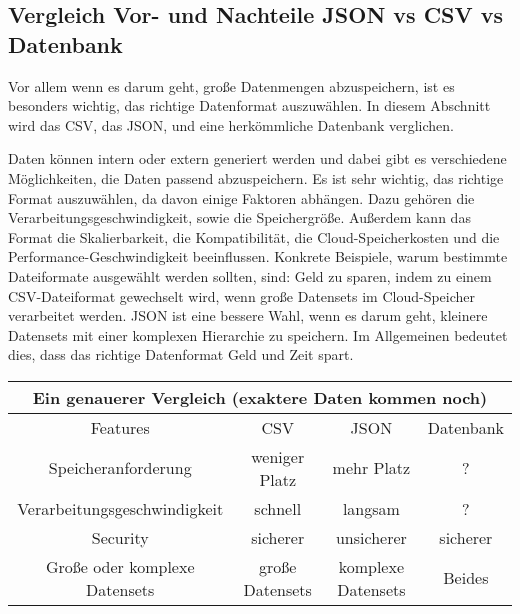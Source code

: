 \subsection{Vergleich Vor- und Nachteile JSON vs CSV vs Datenbank}

Vor allem wenn es darum geht, große Datenmengen abzuspeichern, ist es besonders wichtig, das richtige Datenformat auszuwählen. In diesem Abschnitt wird das CSV, das JSON, und eine herkömmliche Datenbank verglichen. 

Daten können intern oder extern generiert werden und dabei gibt es verschiedene Möglichkeiten, die Daten passend abzuspeichern. Es ist sehr wichtig, das richtige Format auszuwählen, da davon einige Faktoren abhängen. Dazu gehören die Verarbeitungsgeschwindigkeit, sowie die Speichergröße. 
Außerdem kann das Format die Skalierbarkeit, die Kompatibilität, die Cloud-Speicherkosten und die Performance-Geschwindigkeit beeinflussen. 
Konkrete Beispiele, warum bestimmte Dateiformate ausgewählt werden sollten, sind: Geld zu sparen, indem zu einem CSV-Dateiformat gewechselt wird, wenn große Datensets im Cloud-Speicher verarbeitet werden. JSON ist eine bessere Wahl, wenn es darum geht, kleinere Datensets mit einer komplexen Hierarchie zu speichern. 
Im Allgemeinen bedeutet dies, dass das richtige Datenformat Geld und Zeit spart. \cite{csvOrJson}

\begin{center}
    \begin{tabular}{ |c|c|c|c| } 
     \hline
     \multicolumn{4}{|c|}{Ein genauerer Vergleich (exaktere Daten kommen noch) } \\
     \hline
     \hline
     Features & CSV & JSON & Datenbank \\ 
     \hline 
     \hline
     Speicheranforderung & weniger Platz & mehr Platz & ? \\ 
     \hline
     Verarbeitungsgeschwindigkeit & schnell & langsam & ? \\ 
     \hline
     Security & sicherer & unsicherer & sicherer \\ 
     \hline
     Große oder komplexe Datensets & große Datensets & komplexe Datensets & Beides \\ 
     \hline
    \end{tabular} 
    \end{center}
    \cite{csvOrJson}


